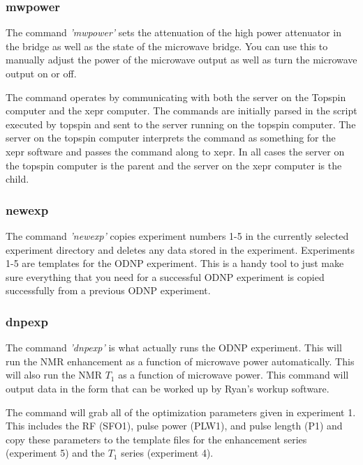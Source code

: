 \documentclass{article}
\newcommand{\fc}[1]{{\color{blue}\textit{'{#1}'}}}
\begin{document}
\subsubsection{mwpower}
The command \fc{mwpower} sets the attenuation of the high power attenuator in the bridge as well as the state of the microwave bridge. You can use this to manually adjust the power of the microwave output as well as turn the microwave output on or off. 

The command operates by communicating with both the server on the Topspin computer and the xepr computer. The commands are initially parsed in the script executed by topspin and sent to the server running on the topspin computer. The server on the topspin computer interprets the command as something for the xepr software and passes the command along to xepr. In all cases the server on the topspin computer is the parent and the server on the xepr computer is the child.


\subsubsection{newexp}
The command \fc{newexp} copies experiment numbers 1-5 in the currently selected experiment directory and deletes any data stored in the experiment. Experiments 1-5 are templates for the ODNP experiment. This is a handy tool to just make sure everything that you need for a successful ODNP experiment is copied successfully from a previous ODNP experiment.

\subsubsection{dnpexp}
The command \fc{dnpexp} is what actually runs the ODNP experiment. This will run the NMR enhancement as a function of microwave power automatically. This will also run the NMR $T_1$ as a function of microwave power. This command will output data in the form that can be worked up by Ryan's workup software.

The command will grab all of the optimization parameters given in experiment 1. This includes the RF (SFO1), pulse power (PLW1), and pulse length (P1) and copy these parameters to the template files for the enhancement series (experiment 5) and the $T_1$ series (experiment 4).
\end{document}
